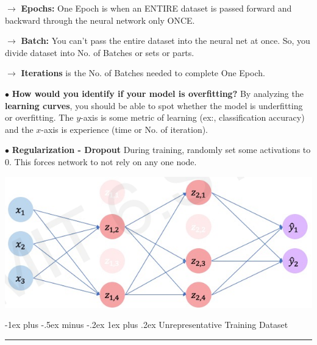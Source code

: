 \documentclass[letterpaper, 10.5pt,landscape]{article}
\makeatletter
\renewcommand{\subsubsection}{\@startsection{subsubsection}{3}{0mm}%
                                {-1ex plus -.5ex minus -.2ex}%
                                {1ex plus .2ex}%
                                {\normalfont\small\bfseries}}
\makeatother
\begin{document}
\begin{multicols*}{3}
\vspace{-3pt}

$\rightarrow$ \textbf{Epochs:} One Epoch is when an ENTIRE dataset is passed forward and backward through the neural network only ONCE.

$\rightarrow$ \textbf{Batch:} You can’t pass the entire dataset into the neural net at once. So, you divide dataset into No. of Batches or sets or parts.

$\rightarrow$ \textbf{Iterations} is the No. of Batches needed to complete One Epoch.



\vspace{3pt}
$\bullet$ \textbf{How would you identify if your model is overfitting?}
By analyzing the \textbf{learning curves}, you should be able to spot whether the model is underfitting or overfitting. The $y$-axis is some metric of learning (ex:, classification accuracy) and the $x$-axis is experience (time or No. of iteration).


\vspace{3pt}
$\bullet$ \textbf{Regularization - Dropout} During training, randomly set some activations to 0. This forces network to not rely on any one node.
\vspace{-3pt}
\begin{center}
    \begin{minipage}{0.60\linewidth}
        \includegraphics[width=\textwidth]{figures/regularization_dropout.PNG}
    \end{minipage}
\end{center}

\vspace{-3pt}



\subsubsection{Unrepresentative Training Dataset} {\color{teal}\hrule height 0.5pt} \smallskip


\end{multicols*}
\end{document}
